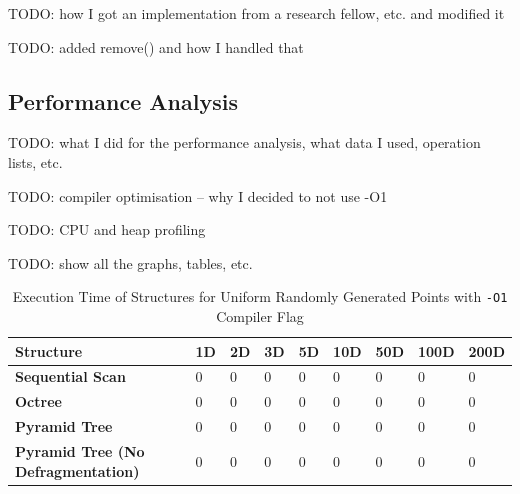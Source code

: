 TODO: how I got an implementation from a research fellow, etc. and modified it

TODO: added remove() and how I handled that

\subsection{Performance Analysis}

TODO: what I did for the performance analysis, what data I used, operation lists, etc.

TODO: compiler optimisation -- why I decided to not use -O1 

TODO: CPU and heap profiling

TODO: show all the graphs, tables, etc.

\begin{table}
	\centering
	\begin{tabular}{|l|l|l|l|l|l|l|l|l|}
		\hline
		\textbf{Structure} & \textbf{1D} & \textbf{2D} & \textbf{3D} & \textbf{5D} & \textbf{10D} & \textbf{50D} & \textbf{100D} & \textbf{200D} \\
		\hline
		\textbf{Sequential Scan} & 0 & 0 & 0 & 0 & 0 & 0 & 0 & 0 \\
		\textbf{Octree} & 0 & 0 & 0 & 0 & 0 & 0 & 0 & 0 \\
		\textbf{Pyramid Tree} & 0 & 0 & 0 & 0 & 0 & 0 & 0 & 0 \\
		\textbf{Pyramid Tree (No Defragmentation)} & 0 & 0 & 0 & 0 & 0 & 0 & 0 & 0 \\
		\hline
	\end{tabular}
	\caption{Execution Time of Structures for Uniform Randomly Generated Points with \texttt{-O1} Compiler Flag}
	\label{tab:perf1-randuniform-o1}
\end{table}

